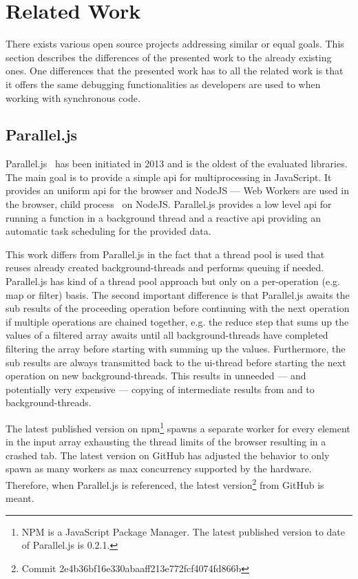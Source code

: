 \section{Related Work}\label{sec:related-work}
There exists various open source projects addressing similar or equal goals. This section describes the differences of the presented work to the already existing ones. One differences that the presented work has to all the related work is that it offers the same debugging functionalities as developers are used to when working with synchronous code.

\subsection{Parallel.js}
Parallel.js~\cite{SavitzkyMayr2016} has been initiated in 2013 and is the oldest of the evaluated libraries. The main goal is to provide a simple api for multiprocessing in JavaScript. It provides an uniform api for the browser and NodeJS --- Web Workers are used in the browser, child process~\cite{childProcess} on NodeJS. Parallel.js provides a low level api for running a function in a background thread and a reactive api providing an automatic task scheduling for the provided data. 

This work differs from Parallel.js in the fact that a thread pool is used that reuses already created background-threads and performs queuing if needed. Parallel.js has kind of a thread pool approach but only on a per-operation (e.g. map or filter) basis. The second important difference is that Parallel.js awaits the sub results of the proceeding operation before continuing with the next operation if multiple operations are chained together, e.g. the reduce step that sums up the values of a filtered array awaits until all background-threads have completed filtering the array before starting with summing up the values. Furthermore, the sub results are always transmitted back to the ui-thread before starting the next operation on new background-threads. This results in unneeded --- and potentially very expensive --- copying of intermediate results from and to background-threads.


The latest published version on npm\footnote{NPM is a JavaScript Package Manager. The latest published version to date of Parallel.js is 0.2.1.} spawns a separate worker for every element in the input array exhausting the thread limits of the browser resulting in a crashed tab. The latest version on GitHub has adjusted the behavior to only spawn as many workers as max concurrency supported by the hardware. Therefore, when Parallel.js is referenced, the latest version\footnote{Commit 2e4b36bf16e330abaaff213e772fcf4074fd866b} from GitHub is meant.

